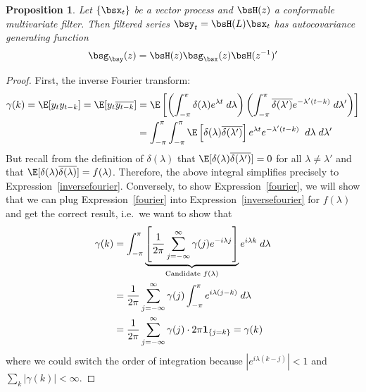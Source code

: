 \documentclass[12pt]{article}
\theoremstyle{plain}
\newtheorem{prop}[thm]{Proposition}
\theoremstyle{definition}
\theoremstyle{remark}
\begin{document}
\begin{prop}
Let $\{\bsx_t\}$ be a vector process and $\bsH(z)$ a conformable
multivariate filter. Then filtered series
$\bsy_t = \bsH(L)\bsx_t$
has autocovariance generating function
\begin{align*}
  \bsg_{\bsy}(z) = \bsH(z)\bsg_{\bsx}(z)\bsH(z^{-1})'
\end{align*}
\end{prop}


\begin{proof}
First, the inverse Fourier transform:
\begin{align*}
  \gamma(k)=
  \E[y_ty_{t-k}] =
  \E[y_t\overline{y_{t-k}}]
  &=
  \E\left[
    \left(
    \int_{-\pi}^\pi \delta(\lambda)e^{\lambda t} \; d\lambda
    \right)
    \left(
    \int_{-\pi}^\pi \overline{\delta(\lambda')}e^{-\lambda' (t-k)} \;
    d\lambda'
    \right)
  \right]
  \\
  &=
  \int_{-\pi}^\pi \int_{-\pi}^\pi
  \E\left[
    \delta(\lambda) \overline{\delta(\lambda')}
  \right]
  e^{\lambda t}e^{-\lambda' (t-k)} \;
  \; d\lambda \; d\lambda'
\end{align*}
But recall from the definition of $\delta(\lambda)$ that
$\E[\delta(\lambda)\overline{\delta(\lambda')}]=0$ for all
$\lambda\neq\lambda'$ and that
$\E[\delta(\lambda)\overline{\delta(\lambda)}]=f(\lambda)$.
Therefore, the above integral simplifies precisely to
Expression~\ref{inversefourier}.
Conversely, to show Expression~\ref{fourier}, we will show that
we can plug Expression~\ref{fourier} into
Expression~\ref{inversefourier} for $f(\lambda)$ and get the correct
result, i.e.\ we want to show that
\begin{align*}
  \gamma(k)
  &= \int_{-\pi}^\pi
  \underbrace{%
  \left[
  \frac{1}{2\pi} \sum_{j=-\infty}^\infty
  \gamma(j) e^{-i\lambda j}
  \right]
  }_{\text{Candidate $f(\lambda)$}}
  e^{i\lambda k}\;d\lambda \\
  &= \frac{1}{2\pi}
  \sum_{j=-\infty}^\infty
  \gamma(j)
  \int_{-\pi}^\pi
  e^{i\lambda (j-k)}
  \;d\lambda
  \\
  &= \frac{1}{2\pi}
  \sum_{j=-\infty}^\infty
  \gamma(j)
  \cdot2\pi \mathbf{1}_{\{j=k\}}
  =\gamma(k)
\end{align*}
where we could switch the order of integration because
$|e^{i\lambda (k-j)}|<1$ and $\sum_k|\gamma(k)|<\infty$.
\end{proof}
\end{document}
